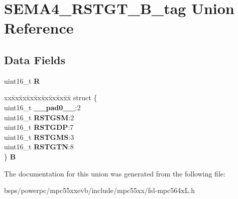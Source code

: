 \hypertarget{unionSEMA4__RSTGT__16B__tag}{}\section{S\+E\+M\+A4\+\_\+\+R\+S\+T\+G\+T\+\_\+B\+\_\+tag Union Reference}
\label{unionSEMA4__RSTGT__16B__tag}
\subsection*{Data Fields}
\begin{DoxyCompactItemize}
\item 
\mbox{\label{unionSEMA4__RSTGT__16B__tag_af81a73c2e9a8771bec1aa06a7e425e63}} 
uint16\+\_\+t {\bfseries R}
\item 
\mbox{\label{unionSEMA4__RSTGT__16B__tag_a0ef86edfd65f2cb26b249650190ed488}} 
\begin{tabbing}
xx\=xx\=xx\=xx\=xx\=xx\=xx\=xx\=xx\=\kill
struct \{\\
\>uint16\_t {\bfseries \_\_pad0\_\_}:2\\
\>uint16\_t {\bfseries RSTGSM}:2\\
\>uint16\_t {\bfseries RSTGDP}:7\\
\>uint16\_t {\bfseries RSTGMS}:3\\
\>uint16\_t {\bfseries RSTGTN}:8\\
\} {\bfseries B}\\

\end{tabbing}\end{DoxyCompactItemize}


The documentation for this union was generated from the following file\+:\begin{DoxyCompactItemize}
\item 
bsps/powerpc/mpc55xxevb/include/mpc55xx/fsl-\/mpc564x\+L.\+h\end{DoxyCompactItemize}
